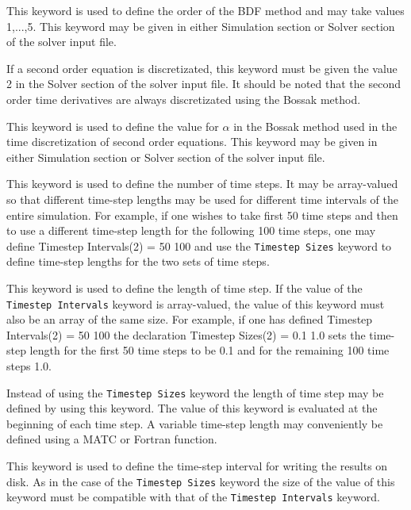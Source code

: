 This keyword is used to define the order of the BDF method and may take 
values 1,...,5. This keyword may be given in either Simulation section or 
Solver section of the solver input file.

If a second order equation is discretizated,
this keyword must be given the value 2 in the Solver section of the solver input
file. It should be noted that the second order time derivatives are always discretizated 
using the Bossak method.

This keyword is used to define the value for $\alpha$ in the Bossak method used
in the time discretization of second order equations.
This keyword may be given in either Simulation section or Solver section
of the solver input file.

This keyword is used to define the number of time steps. 
It may be array-valued so that different time-step lengths may be used
for different time intervals of the entire simulation. For example,  
if one wishes to take first 50 time steps and then to use a
different time-step length for the following 100 time steps, one may     
define
\ttbegin
Timestep Intervals(2) = 50 100
\ttend
and use the {\tt Timestep Sizes} keyword to define time-step lengths for 
the two sets of time steps. 

This keyword is used to define the length of time step. 
If the value of the {\tt Timestep Intervals} keyword is array-valued,
the value of this keyword must also be an array of the same size.      
For example, if one has defined
\ttbegin
Timestep Intervals(2) = 50 100
\ttend
the declaration
\ttbegin
Timestep Sizes(2) = 0.1 1.0
\ttend
sets the time-step length for the first 50 time steps to be 0.1 and for the remaining
100 time steps 1.0.

Instead of using the {\tt Timestep Sizes} keyword the length of time step
may be defined by using this keyword.  The value of this keyword is evaluated
at the beginning of each time step. A variable time-step length may conveniently be 
defined using a MATC or Fortran function. 

This keyword is used to define the time-step interval for writing the results on disk.
As in the case of the {\tt Timestep Sizes} keyword the size of the value of this keyword
must be compatible with that of the {\tt Timestep Intervals} keyword. 


